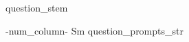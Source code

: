 \begin{question}
    {{ question_stem }}

    \begin{tabular}{ { {{-num_column-}} }{S{m{\tabcolsep\relax}}} }
        {{ question_prompts_str }}
    \end{tabular}
\end{question}